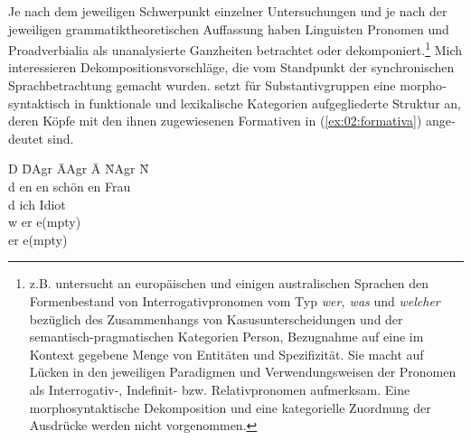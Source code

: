 \documentclass[output=paper, colorlinks, citecolor=brown, booklanguage=german]{langscibook}
\begin{document}
\begin{otherlanguage}{german}
Je nach dem jeweiligen Schwerpunkt einzelner Untersuchungen und je nach der jeweiligen grammatiktheoretischen Auffassung haben Linguisten Pronomen und Proadverbialia als unanalysierte Ganzheiten betrachtet oder dekomponiert.\footnote{\citet{Nau1999} z.B. untersucht an europäischen und einigen australischen Sprachen den Formenbestand von Interrogativpronomen vom Typ \textit{wer, was} und \textit{welcher} bezüglich des Zusammenhangs von Kasusunterscheidungen und der semantisch-pragmatischen Kategorien Person, Bezugnahme auf eine im Kontext gegebene Menge von Entitäten und Spezifizität. Sie macht auf Lücken in den jeweiligen Paradigmen und Verwendungsweisen der Pronomen als \linebreak Interrogativ-, Indefinit- bzw. Relativpronomen aufmerksam. Eine morphosyntaktische Dekomposition und eine kategorielle Zuordnung der Ausdrücke werden nicht vorgenommen.} Mich interessieren Dekompositionsvorschläge, die vom Standpunkt der synchronischen Sprachbetrachtung gemacht wurden. \citet{Lenerz1993} setzt für Substantivgruppen eine morphosyntaktisch in funktionale und lexikalische Kategorien aufgegliederte Struktur an, deren Köpfe mit den ihnen zugewiesenen Formativen in (\ref{ex:02:formativa}) angedeutet sind.


\ea\label{ex:02:formativa}
\begin{tabbing}
    D   \hspace{1cm} \= DAgr \hspace{1cm}   \= AAgr  \hspace{1cm}  \= A \hspace{1cm}    \= NAgr \hspace{1cm}   \= N\\
    d                \> en                  \> en                   \> schön            \> en                   \> Frau\\
    d                \> ich                 \>                      \>                  \>                      \> Idiot\\
    w                \> er                  \>                      \>                  \>                      \> e(mpty)\\
                     \> er                  \>                      \>                  \>                      \> e(mpty)\\
\end{tabbing}
\z 


\end{otherlanguage}
\end{document}
